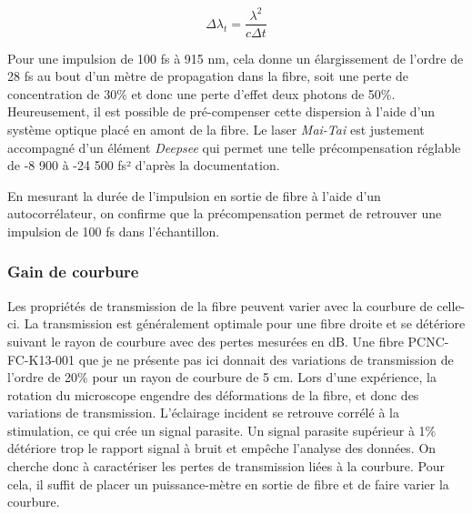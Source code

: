 $$
\Delta \lambda_t = \frac{\lambda^2}{c\Delta t}
$$

Pour une impulsion de 100 fs à 915 nm, cela donne un élargissement de l'ordre de 28 fs au bout d'un mètre de propagation dans la fibre, soit une perte de concentration de 30\% et donc une perte d'effet deux photons de 50\%. Heureusement, il est possible de pré-compenser cette dispersion à l'aide d'un système optique placé en amont de la fibre. Le laser \emph{Mai-Tai} est justement accompagné d'un élément \emph{Deepsee} qui permet une telle précompensation réglable de -8 900 à -24 500 fs² d'après la documentation.


En mesurant la durée de l'impulsion en sortie de fibre à l'aide d'un autocorrélateur, on confirme que la précompensation permet de retrouver une impulsion de 100 fs dans l'échantillon.

\subsubsection{Gain de courbure}


Les propriétés de transmission de la fibre peuvent varier avec la courbure de celle-ci. La transmission est généralement optimale pour une fibre droite et se détériore suivant le rayon de courbure avec des pertes mesurées en dB. Une fibre PCNC-FC-K13-001 que je ne présente pas ici donnait des variations de transmission de l'ordre de 20\% pour un rayon de courbure de 5 cm.
Lors d'une expérience, la rotation du microscope engendre des déformations de la fibre, et donc des variations de transmission. L'éclairage incident se retrouve corrélé à la stimulation, ce qui crée un signal parasite. Un signal parasite supérieur à 1\% détériore trop le rapport signal à bruit et empêche l'analyse des données. On cherche donc à caractériser les pertes de transmission liées à la courbure. Pour cela, il suffit de placer un puissance-mètre en sortie de fibre et de faire varier la courbure.

